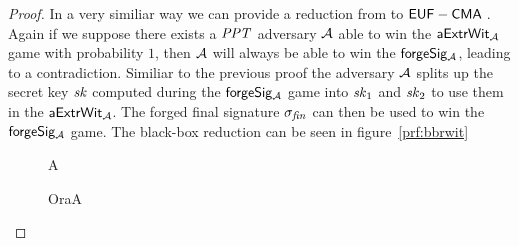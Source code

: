 \begin{proof}
    In a very similiar way we can provide a reduction from \cnstWitnessExtractability to $\mathsf{EUF-CMA\;}$. Again if we suppose there exists a $\mathit{PPT}$ adversary $\mathcal{A}$ able to win the $\mathsf{aExtrWit_{\mathcal{A}}}$ game with probability $1$, then $\mathcal{A}$ will always be able to win the $\mathsf{forgeSig_{\mathcal{A}}}$, leading to a contradiction. Similiar to the previous proof the adversary $\mathcal{A}$ splits up the secret key $\mathit{sk}$ computed during the $\mathsf{forgeSig_{\mathcal{A}}}$ game into $\mathit{sk}_1$ and $\mathit{sk}_2$ to use them in the $\mathsf{aExtrWit_{\mathcal{A}}}$. The forged final signature $\sigma_{\mathit{fin}}$ can then be used to win the $\mathsf{forgeSig_{\mathcal{A}}}$ game. The black-box reduction can be seen in figure~\ref{prf:bbrwit}

    \begin{figure}
        \begin{center}
            \begin{bbrenv}{A}
                \begin{bbrbox}[name=\cnstEUFCMA]
                \end{bbrbox}
                \begin{bbroracle}{OraA}

\end{bbroracle}
\end{bbrenv}
\end{center}
\end{figure}
\end{proof}
